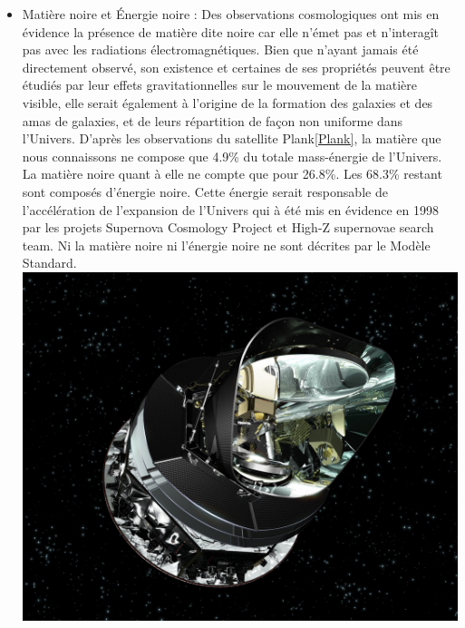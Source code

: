 \begin{itemize}[label=$\bullet$]
\item Matière noire et Énergie noire : Des observations cosmologiques ont mis en évidence la présence de matière dite noire car elle n'émet pas et n'interagît pas avec les radiations électromagnétiques. Bien que n'ayant jamais été directement observé, son existence et certaines de ses propriétés peuvent être étudiés par leur effets gravitationnelles sur le mouvement de la matière visible, elle serait  également à l'origine de la formation des galaxies et des amas de galaxies, et de leurs répartition de façon non uniforme dans l'Univers. D'après les observations du satellite Plank\ref{Plank},
la matière que nous connaissons ne compose que 4.9\% du totale mass-énergie de l'Univers. La matière noire quant à elle ne compte que pour 26.8\%. Les 68.3\% restant sont composés d'énergie noire. Cette énergie serait responsable de l'accélération de  l'expansion de l'Univers qui à été mis en évidence en 1998 par les projets Supernova Cosmology Project et High-Z supernovae search team. Ni la matière noire ni l'énergie noire ne sont décrites par le Modèle Standard.
\marginpar
{
\centering
\includegraphics[width=\marginparwidth]{SM/plank.jpg}
\label{Plank}
} 
\end{itemize}